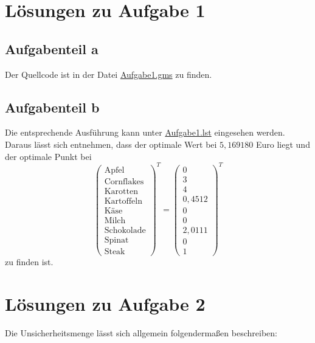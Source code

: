 \documentclass[a4paper,12pt]{article}
\begin{document}
\newpage

\section*{L\"osungen zu Aufgabe 1}

\subsection*{Aufgabenteil a}

Der Quellcode ist in der Datei \href{../src/r1/Aufgabe1.gms}{Aufgabe1.gms} zu finden.

\subsection*{Aufgabenteil b}

Die entsprechende Ausf\"uhrung kann unter \href{../results/r1/Aufgabe1.lst}{Aufgabe1.lst} eingesehen werden. Daraus l\"asst sich entnehmen, dass der optimale Wert bei $5,169180$ Euro liegt und der optimale Punkt bei
\[
\begin{pmatrix}
\text{Apfel} \\ 
\text{Cornflakes} \\ 
\text{Karotten} \\ 
\text{Kartoffeln} \\ 
\text{K\"ase} \\ 
\text{Milch} \\ 
\text{Schokolade} \\ 
\text{Spinat} \\ 
\text{Steak}
\end{pmatrix}^T
=
\begin{pmatrix}
0 \\ 
3 \\ 
4 \\ 
0,4512 \\ 
0 \\ 
0 \\ 
2,0111 \\
0 \\
1
\end{pmatrix}^T
\]
zu finden ist.

\newpage

\section*{L\"osungen zu Aufgabe 2}

Die Unsicherheitsmenge l\"asst sich allgemein folgenderma\ss en beschreiben:
\end{document}
